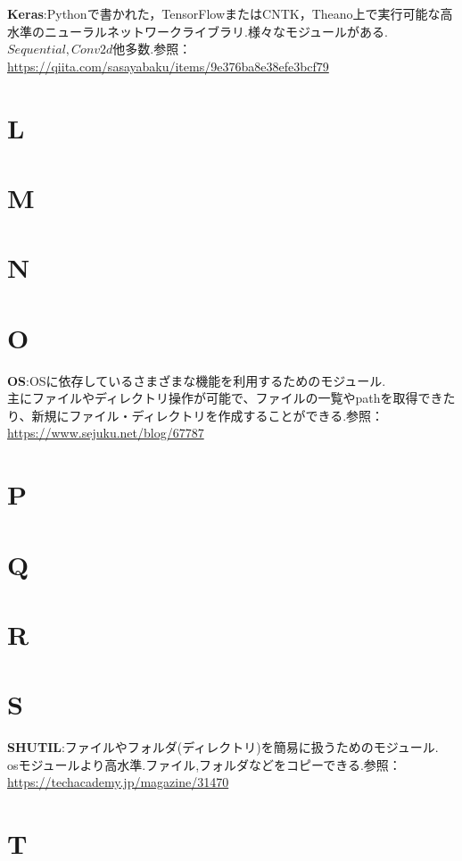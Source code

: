 \documentclass[a4paper,10pt,titlepage]{jsarticle}
\begin{document}
\textbf{Keras}:Pythonで書かれた，TensorFlowまたはCNTK，Theano上で実行可能な高水準のニューラルネットワークライブラリ.様々なモジュールがある.\quad $Sequential,Conv2d$他多数.参照：\url{https://qiita.com/sasayabaku/items/9e376ba8e38efe3bcf79}

\section{L}

\section{M}

\section{N}

\section{O}

\textbf{OS}:OSに依存しているさまざまな機能を利用するためのモジュール.\\
主にファイルやディレクトリ操作が可能で、ファイルの一覧やpathを取得できたり、新規にファイル・ディレクトリを作成することができる.参照：\url{https://www.sejuku.net/blog/67787}


\section{P}

\section{Q}

\section{R}

\section{S}

\textbf{SHUTIL}:ファイルやフォルダ(ディレクトリ)を簡易に扱うためのモジュール.\\
osモジュールより高水準.ファイル,フォルダなどをコピーできる.参照：\url{https://techacademy.jp/magazine/31470}

\section{T}
\end{document}
